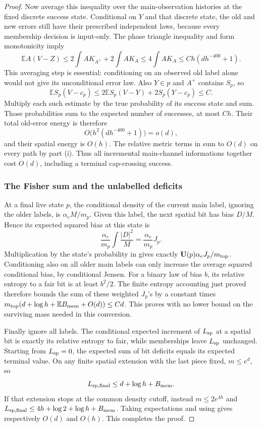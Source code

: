 \begin{proof}
Now average this inequality over the main-observation histories at
the fixed discrete success state.  Conditional on $Y$ and that
discrete state, the old and new errors still have their prescribed
independent laws, because every membership decision is input-only.
The phase triangle inequality and form monotonicity imply
\[
 \mathbb E A(V-Z)
   \le2\int A K_{A^+}+2\int A K_A
   \le4\int A K_A
   \le C h(dh^{-400}+1).
\]
This averaging step is essential: conditioning on an observed old
label alone would not give its unconditional error law.  Also
$Y\in p$ and $A^+$ contains $S_p$, so
\[
 \mathbb E S_p(V-c_p)
    \le2\mathbb E S_p(V-Y)+2S_p(Y-c_p)\le C.
\]
Multiply each such estimate by the true probability of its success
state and sum.  Those probabilities sum to the expected number of
successes, at most $Ch$.  Their total old-error energy is therefore
\[
 O\bigl(h^2(dh^{-400}+1)\bigr)=o(d),
\]
and their spatial energy is $O(h)$.  The relative metric terms in
 sum to $O(d)$ on every path by
part \textup{(i)}.  Thus all incremental main-channel informations
together cost $O(d)$, including a terminal cap-crossing success.

\subsubsection*{The Fisher sum and the unlabelled deficits}
At a final live state $p$, the conditional density of the current
main label, ignoring the older labels, is $\alpha_e M/m_p$.  Given
this label, the next spatial bit has bias $D/M$.  Hence its expected
squared bias at this state is
\[
 \frac{\alpha_e}{m_p}\int\frac{|D|^2}{M}
       =\frac{\alpha_e}{m_p}J_p.
\]
Multiplication by the state's probability in
 gives exactly
$\mathbf U(p)\alpha_e J_p/m_{\rm top}$.  Conditioning also on
all older main labels can only increase the average squared
conditional bias, by conditional Jensen.  For a binary law of bias
$b$, its relative entropy to a fair bit is at least $b^2/2$.
The finite entropy accounting just proved therefore bounds the sum
of these weighted $J_p$'s by a constant times
$m_{\rm top}(d+\log h+\mathbb E B_{\rm mem}+O(d))\le Cd$.
This proves  with no lower bound on the surviving
mass needed in this conversion.

Finally ignore all labels.  The conditional expected increment of
$L_{\rm sp}$ at a spatial bit is exactly its relative entropy to
fair, while memberships leave $L_{\rm sp}$ unchanged.  Starting
from $L_{\rm sp}=0$, the expected sum of bit deficits equals its
expected terminal value.  On any finite spatial extension with the
last piece fixed, $m\le e^d$, so
\[
 L_{\rm sp,final}\le d+\log h+B_{\rm mem}.
\]
If that extension stops at the common density cutoff, instead
$m\le2e^{4h}$ and
$L_{\rm sp,final}\le4h+\log2+\log h+B_{\rm mem}$.
Taking expectations and using  gives respectively
$O(d)$ and $O(h)$.  This completes the proof.
\end{proof}
